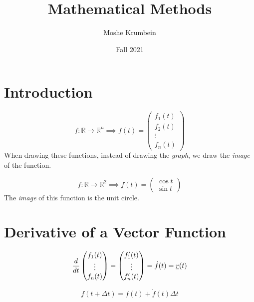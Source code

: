 \documentclass[00_complete]{subfiles}
\title{Mathematical Methods}
\author{Moshe Krumbein}
\date{Fall 2021}
\begin{document}

\section{Introduction}

\begin{definition}
    $$f: \mathbb{R} \to \mathbb{R}^n \implies f(t) = \begin{pmatrix}
        f_1(t) \\f_2(t)\\ \vdots \\ f_n(t)
    \end{pmatrix}$$
When drawing these functions, instead of drawing the \emph{graph}, we draw the
\emph{image} of the function.
\begin{example}
    $$f: \mathbb{R} \to \mathbb{R}^2 \implies f(t) = \begin{pmatrix}
        \cos t \\ \sin t
    \end{pmatrix}$$
    The \emph{image} of this function is the unit circle.
\end{example}
\end{definition}
\section{Derivative of a Vector Function}
\begin{definition}
    $$
    \begin{gathered}
        \dv{t}\begin{pmatrix}
            f_1(t)\\ \vdots \\ f_n(t)
        \end{pmatrix} = \begin{pmatrix}
            f_1'(t) \\ \vdots \\ f_n'(t)
        \end{pmatrix} = \dot f(t) = \underline r(t)
    \end{gathered}
    $$
\end{definition}
\begin{definition}
    $$f(t + \Delta t) = f(t) + \dot f(t)\Delta t$$
\end{definition}
\end{document}
